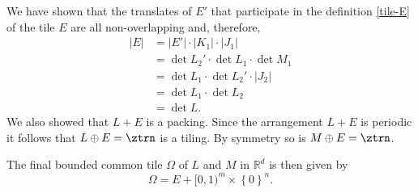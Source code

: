 \documentclass[12pt,a4paper,oneside]{amsart}
\theoremstyle{plain}
\theoremstyle{definition}
\newcommand{\Abs}[1]{{\left|{#1}\right|}}
\newcommand{\Set}[1]{{\left\{{#1}\right\}}}
\newcommand{\RR}{{\mathbb R}}
\begin{document}
We have shown that the translates of $E'$ that participate in the definition \eqref{tile-E} of the tile $E$ are all non-overlapping and, therefore,
\begin{align}\label{E-volume}
\Abs{E} &= \Abs{E'} \cdot \Abs{K_1} \cdot \Abs{J_1} \\
 &= \det L_2' \cdot \det L_1 \cdot \det M_1 \nonumber\\
 &= \det L_1 \cdot \det L_2' \cdot\Abs{J_2}\nonumber \\
 &= \det L_1 \cdot \det L_2 \nonumber \\
 &= \det L. \nonumber
\end{align} 
We also showed that $L+E$ is a packing. Since the arrangement $L+E$ is periodic it follows that $L\oplus E = \ztrn$ is a tiling. By symmetry so is $M \oplus E = \ztrn$. 

The final bounded common tile $\Omega$ of $L$ and $M$ in $\RR^d$ is then given by
$$
\Omega = E + [0,1)^m\times\Set{0}^n.
$$






\end{document}
